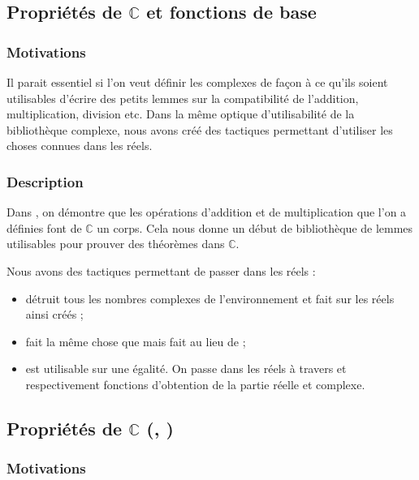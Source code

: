 \subsection{Propriétés de $\mathbb{C}$ et fonctions de base}

\subsubsection{Motivations}

Il parait essentiel si l'on veut définir les complexes de façon à ce qu'ils soient utilisables d'écrire des petits lemmes sur la compatibilité de l'addition, multiplication, division etc. Dans la même optique d'utilisabilité de la bibliothèque complexe, nous avons créé des tactiques permettant d'utiliser les choses connues dans les réels.

\subsubsection{Description}

Dans , on démontre que les opérations d'addition et de multiplication que l'on a définies font de $\mathbb{C}$ un corps. Cela nous donne un début de bibliothèque de lemmes utilisables pour prouver des théorèmes dans $\mathbb{C}$.

Nous avons des tactiques permettant de passer dans les réels : 
\begin{itemize}
 \item {} détruit tous les nombres complexes de l'environnement et fait  sur les réels ainsi créés ;
 \item {} fait la même chose que  mais fait  au lieu de  ;
 \item {} est utilisable sur une égalité. On passe dans les réels à travers  et  respectivement fonctions d'obtention de la partie réelle et complexe.
\end{itemize}

\subsection{Propriétés de $\mathbb{C}$ (, )}

\subsubsection{Motivations}

